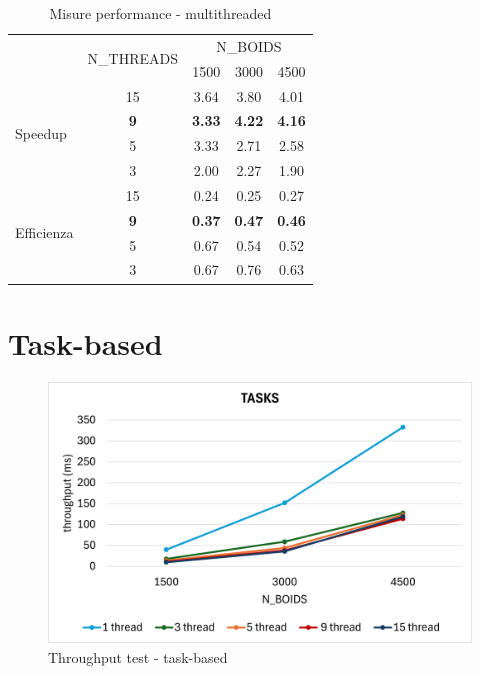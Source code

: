 \documentclass[a4paper,12pt]{report}
\begin{document}
\begin{table}[!htb]
    \renewcommand{\arraystretch}{1.5}
    \centering
    \begin{tabular}{|l|c|ccc|}
        \hline
        \multicolumn{1}{|c|}{}      & \multirow{2}{*}{N\_THREADS} & \multicolumn{3}{c|}{N\_BOIDS}                                \\ \cline{3-5}
        \multicolumn{1}{|c|}{}      &                     & \multicolumn{1}{c|}{1500} & \multicolumn{1}{c|}{3000} & 4500 \\ \hline
        \multirow{4}{*}{Speedup}    & 15                  & \multicolumn{1}{c|}{3.64} & \multicolumn{1}{c|}{3.80} & 4.01 \\ \cline{2-5} 
         & \textbf{9}                    & \multicolumn{1}{c|}{\textbf{3.33}} & \multicolumn{1}{c|}{\textbf{4.22}} & \textbf{4.16} \\ \cline{2-5} 
         & 5 & \multicolumn{1}{c|}{3.33} & \multicolumn{1}{c|}{2.71} & 2.58 \\ \cline{2-5} 
         & 3 & \multicolumn{1}{c|}{2.00} & \multicolumn{1}{c|}{2.27} & 1.90 \\ \hline
        \multirow{4}{*}{Efficienza} & 15                  & \multicolumn{1}{c|}{0.24} & \multicolumn{1}{c|}{0.25} & 0.27 \\ \cline{2-5} 
         & \textbf{9}   & \multicolumn{1}{c|}{\textbf{0.37}} & \multicolumn{1}{c|}{\textbf{0.47}} & \textbf{0.46} \\ \cline{2-5} 
         & 5            & \multicolumn{1}{c|}{0.67} & \multicolumn{1}{c|}{0.54} & 0.52 \\ \cline{2-5} 
         & 3            & \multicolumn{1}{c|}{0.67} & \multicolumn{1}{c|}{0.76} & 0.63 \\ \hline
    \end{tabular}
    \caption{Misure performance - multithreaded}
    \label{table:performance_multithreaded}
\end{table}

\section{Task-based}
\begin{figure}[H]
    \centering
    \includegraphics[width=\linewidth]{figures/tasks_test.png}
    \caption{\centering Throughput test - task-based}
    \label{fig:throughput-test-tasks}
\end{figure}
\end{document}
